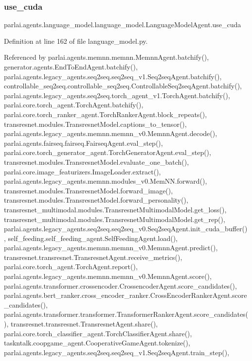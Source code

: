 \subsubsection{\texorpdfstring{use\+\_\+cuda}{use\_cuda}}
{\footnotesize\ttfamily parlai.\+agents.\+language\+\_\+model.\+language\+\_\+model.\+Language\+Model\+Agent.\+use\+\_\+cuda}



Definition at line 162 of file language\+\_\+model.\+py.



Referenced by parlai.\+agents.\+memnn.\+memnn.\+Memnn\+Agent.\+batchify(), generator.\+agents.\+End\+To\+End\+Agent.\+batchify(), parlai.\+agents.\+legacy\+\_\+agents.\+seq2seq.\+seq2seq\+\_\+v1.\+Seq2seq\+Agent.\+batchify(), controllable\+\_\+seq2seq.\+controllable\+\_\+seq2seq.\+Controllable\+Seq2seq\+Agent.\+batchify(), parlai.\+agents.\+legacy\+\_\+agents.\+seq2seq.\+torch\+\_\+agent\+\_\+v1.\+Torch\+Agent.\+batchify(), parlai.\+core.\+torch\+\_\+agent.\+Torch\+Agent.\+batchify(), parlai.\+core.\+torch\+\_\+ranker\+\_\+agent.\+Torch\+Ranker\+Agent.\+block\+\_\+repeats(), transresnet.\+modules.\+Transresnet\+Model.\+captions\+\_\+to\+\_\+tensor(), parlai.\+agents.\+legacy\+\_\+agents.\+memnn.\+memnn\+\_\+v0.\+Memnn\+Agent.\+decode(), parlai.\+agents.\+fairseq.\+fairseq.\+Fairseq\+Agent.\+eval\+\_\+step(), parlai.\+core.\+torch\+\_\+generator\+\_\+agent.\+Torch\+Generator\+Agent.\+eval\+\_\+step(), transresnet.\+modules.\+Transresnet\+Model.\+evaluate\+\_\+one\+\_\+batch(), parlai.\+core.\+image\+\_\+featurizers.\+Image\+Loader.\+extract(), parlai.\+agents.\+legacy\+\_\+agents.\+memnn.\+modules\+\_\+v0.\+Mem\+N\+N.\+forward(), transresnet.\+modules.\+Transresnet\+Model.\+forward\+\_\+image(), transresnet.\+modules.\+Transresnet\+Model.\+forward\+\_\+personality(), transresnet\+\_\+multimodal.\+modules.\+Transresnet\+Multimodal\+Model.\+get\+\_\+loss(), transresnet\+\_\+multimodal.\+modules.\+Transresnet\+Multimodal\+Model.\+get\+\_\+rep(), parlai.\+agents.\+legacy\+\_\+agents.\+seq2seq.\+seq2seq\+\_\+v0.\+Seq2seq\+Agent.\+init\+\_\+cuda\+\_\+buffer(), self\+\_\+feeding.\+self\+\_\+feeding\+\_\+agent.\+Self\+Feeding\+Agent.\+load(), parlai.\+agents.\+legacy\+\_\+agents.\+memnn.\+memnn\+\_\+v0.\+Memnn\+Agent.\+predict(), transresnet.\+transresnet.\+Transresnet\+Agent.\+receive\+\_\+metrics(), parlai.\+core.\+torch\+\_\+agent.\+Torch\+Agent.\+report(), parlai.\+agents.\+legacy\+\_\+agents.\+memnn.\+memnn\+\_\+v0.\+Memnn\+Agent.\+score(), parlai.\+agents.\+transformer.\+crossencoder.\+Crossencoder\+Agent.\+score\+\_\+candidates(), parlai.\+agents.\+bert\+\_\+ranker.\+cross\+\_\+encoder\+\_\+ranker.\+Cross\+Encoder\+Ranker\+Agent.\+score\+\_\+candidates(), parlai.\+agents.\+transformer.\+transformer.\+Transformer\+Ranker\+Agent.\+score\+\_\+candidates(), transresnet.\+transresnet.\+Transresnet\+Agent.\+share(), parlai.\+core.\+torch\+\_\+classifier\+\_\+agent.\+Torch\+Classifier\+Agent.\+share(), taskntalk.\+coopgame\+\_\+agent.\+Cooperative\+Game\+Agent.\+tokenize(), parlai.\+agents.\+legacy\+\_\+agents.\+seq2seq.\+seq2seq\+\_\+v1.\+Seq2seq\+Agent.\+train\+\_\+step(), 